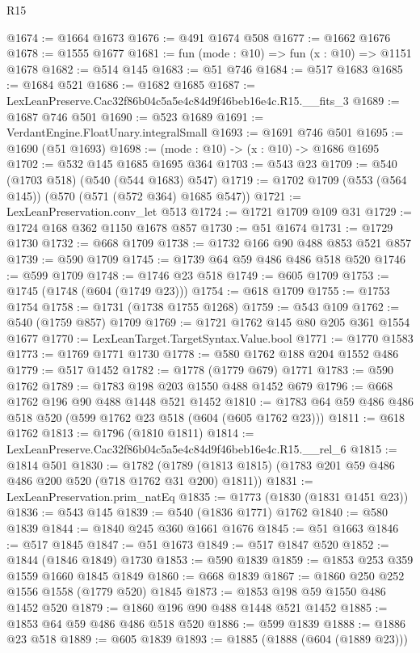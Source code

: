 \begin{lexlean}{R15}
\begin{coremodule}
@1674 := @1664 @1673
@1676 := @491 @1674 @508
@1677 := @1662 @1676
@1678 := @1555 @1677
@1681 := fun (mode : @10) => fun (x : @10) => @1151 @1678
@1682 := @514 @145
@1683 := @51 @746
@1684 := @517 @1683
@1685 := @1684 @521
@1686 := @1682 @1685
@1687 := LexLeanPreserve.Cac32f86b04c5a5e4c84d9f46beb16e4c.R15.__fits_3
@1689 := @1687 @746 @501
@1690 := @523 @1689
@1691 := VerdantEngine.FloatUnary.integralSmall
@1693 := @1691 @746 @501
@1695 := @1690 (@51 @1693)
@1698 := (mode : @10) -> (x : @10) -> @1686 @1695
@1702 := @532 @145 @1685 @1695 @364
@1703 := @543 @23
@1709 := @540 (@1703 @518) (@540 (@544 @1683) @547)
@1719 := @1702 @1709 (@553 (@564 @145)) (@570 (@571 (@572 @364) @1685 @547))
@1721 := LexLeanPreservation.conv_let @513
@1724 := @1721 @1709 @109 @31
@1729 := @1724 @168 @362 @1150 @1678 @857
@1730 := @51 @1674
@1731 := @1729 @1730
@1732 := @668 @1709
@1738 := @1732 @166 @90 @488 @853 @521 @857
@1739 := @590 @1709
@1745 := @1739 @64 @59 @486 @486 @518 @520
@1746 := @599 @1709
@1748 := @1746 @23 @518
@1749 := @605 @1709
@1753 := @1745 (@1748 (@604 (@1749 @23)))
@1754 := @618 @1709
@1755 := @1753 @1754
@1758 := @1731 (@1738 @1755 @1268)
@1759 := @543 @109
@1762 := @540 (@1759 @857) @1709
@1769 := @1721 @1762 @145 @80 @205 @361 @1554 @1677
@1770 := LexLeanTarget.TargetSyntax.Value.bool
@1771 := @1770 @1583
@1773 := @1769 @1771 @1730
@1778 := @580 @1762 @188 @204 @1552 @486
@1779 := @517 @1452
@1782 := @1778 (@1779 @679) @1771
@1783 := @590 @1762
@1789 := @1783 @198 @203 @1550 @488 @1452 @679
@1796 := @668 @1762 @196 @90 @488 @1448 @521 @1452
@1810 := @1783 @64 @59 @486 @486 @518 @520 (@599 @1762 @23 @518 (@604 (@605 @1762 @23)))
@1811 := @618 @1762
@1813 := @1796 (@1810 @1811)
@1814 := LexLeanPreserve.Cac32f86b04c5a5e4c84d9f46beb16e4c.R15.__rel_6
@1815 := @1814 @501
@1830 := @1782
    (@1789 (@1813 @1815) (@1783 @201 @59 @486 @486 @200 @520 (@718 @1762 @31 @200) @1811))
@1831 := LexLeanPreservation.prim_natEq
@1835 := @1773 (@1830 (@1831 @1451 @23))
@1836 := @543 @145
@1839 := @540 (@1836 @1771) @1762
@1840 := @580 @1839
@1844 := @1840 @245 @360 @1661 @1676
@1845 := @51 @1663
@1846 := @517 @1845
@1847 := @51 @1673
@1849 := @517 @1847 @520
@1852 := @1844 (@1846 @1849) @1730
@1853 := @590 @1839
@1859 := @1853 @253 @359 @1559 @1660 @1845 @1849
@1860 := @668 @1839
@1867 := @1860 @250 @252 @1556 @1558 (@1779 @520) @1845
@1873 := @1853 @198 @59 @1550 @486 @1452 @520
@1879 := @1860 @196 @90 @488 @1448 @521 @1452
@1885 := @1853 @64 @59 @486 @486 @518 @520
@1886 := @599 @1839
@1888 := @1886 @23 @518
@1889 := @605 @1839
@1893 := @1885 (@1888 (@604 (@1889 @23)))

\end{coremodule}
\end{lexlean}

